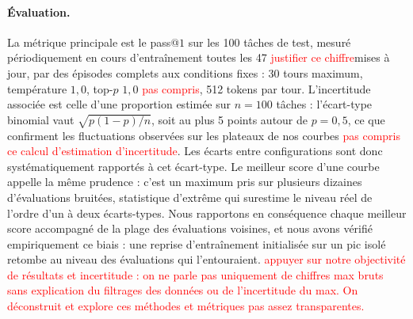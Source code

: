 \documentclass[11pt,a4paper]{article}
\begin{document}
\paragraph{Évaluation.} La métrique principale est le pass@$1$ sur les 100 tâches de test, mesuré périodiquement en cours d'entraînement toutes les 47 \textcolor{red}{justifier ce chiffre}mises à jour, par des épisodes complets aux conditions fixes : 30 tours maximum, température $1{,}0$, top-$p$ $1{,}0$ \textcolor{red}{pas compris}, 512 tokens par tour. L'incertitude associée est celle d'une proportion estimée sur $n=100$ tâches : l'écart-type binomial vaut $\sqrt{p(1-p)/n}$, soit au plus 5 points autour de $p = 0{,}5$, ce que confirment les fluctuations observées sur les plateaux de nos courbes \textcolor{red}{pas compris ce calcul d'estimation d'incertitude}. Les écarts entre configurations sont donc systématiquement rapportés à cet écart-type. Le meilleur score d'une courbe appelle la même prudence : c'est un maximum pris sur plusieurs dizaines d'évaluations bruitées, statistique d'extrême qui surestime le niveau réel de l'ordre d'un à deux écarts-types. Nous rapportons en conséquence chaque meilleur score accompagné de la plage des évaluations voisines, et nous avons vérifié empiriquement ce biais : une reprise d'entraînement initialisée sur un pic isolé retombe au niveau des évaluations qui l'entouraient. \textcolor{red}{appuyer sur notre objectivité de résultats et incertitude : on ne parle pas uniquement de chiffres max bruts sans explication du filtrages des données ou de l'incertitude du max. On déconstruit et explore ces méthodes et métriques pas assez transparentes.}
\end{document}
